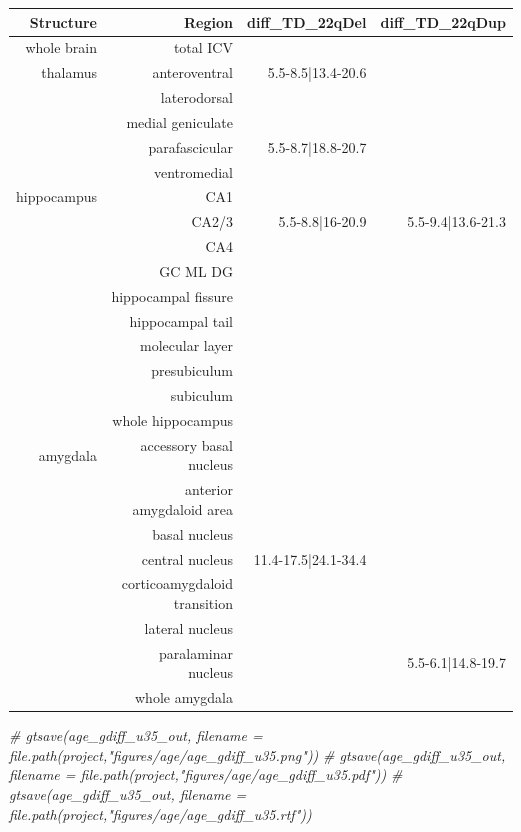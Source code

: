 \documentclass[
]{article}
\newenvironment{Shaded}{\begin{snugshade}}{\end{snugshade}}
\newcommand{\CommentTok}[1]{\textcolor[rgb]{0.56,0.35,0.01}{\textit{#1}}}
\begin{document}
\begin{longtable}{rrrr}
\toprule
Structure & Region & diff\_TD\_22qDel & diff\_TD\_22qDup \\ 
\midrule\addlinespace[2.5pt]
whole brain & total ICV &  &  \\ 
thalamus & anteroventral & 5.5-8.5|13.4-20.6 &  \\ 
 & laterodorsal &  &  \\ 
 & medial geniculate &  &  \\ 
 & parafascicular & 5.5-8.7|18.8-20.7 &  \\ 
 & ventromedial &  &  \\ 
hippocampus & CA1 &  &  \\ 
 & CA2/3 & 5.5-8.8|16-20.9 & 5.5-9.4|13.6-21.3 \\ 
 & CA4 &  &  \\ 
 & GC ML DG &  &  \\ 
 & hippocampal fissure &  &  \\ 
 & hippocampal tail &  &  \\ 
 & molecular layer &  &  \\ 
 & presubiculum &  &  \\ 
 & subiculum &  &  \\ 
 & whole hippocampus &  &  \\ 
amygdala & accessory basal nucleus &  &  \\ 
 & anterior amygdaloid area &  &  \\ 
 & basal nucleus &  &  \\ 
 & central nucleus & 11.4-17.5|24.1-34.4 &  \\ 
 & corticoamygdaloid transition &  &  \\ 
 & lateral nucleus &  &  \\ 
 & paralaminar nucleus &  & 5.5-6.1|14.8-19.7 \\ 
 & whole amygdala &  &  \\ 
\bottomrule
\end{longtable}

\begin{Shaded}
\begin{Highlighting}[]
\CommentTok{\# gtsave(age\_gdiff\_u35\_out, filename = file.path(project,"figures/age/age\_gdiff\_u35.png"))}
\CommentTok{\# gtsave(age\_gdiff\_u35\_out, filename = file.path(project,"figures/age/age\_gdiff\_u35.pdf"))}
\CommentTok{\# gtsave(age\_gdiff\_u35\_out, filename = file.path(project,"figures/age/age\_gdiff\_u35.rtf"))}
\end{Highlighting}
\end{Shaded}
\end{document}
